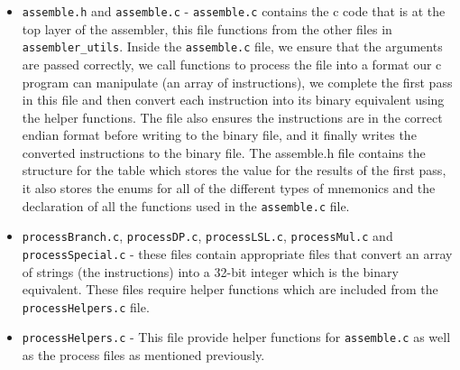 \documentclass[10pt]{article}
\begin{document}
\begin{itemize}
	\item {\tt{assemble.h}} and {\tt{assemble.c}} - {\tt{assemble.c}} contains the c code that is at the top layer of the assembler, this file functions from the other files in {\tt{assembler\_utils}}. Inside the {\tt{assemble.c}} file, we ensure that the arguments are passed correctly, we call functions to process the file into a format our c program can manipulate (an array of instructions), we complete the first pass in this file and then convert each instruction into its binary equivalent using the helper functions. The file also ensures the instructions are in the correct endian format before writing to the binary file, and it finally writes the converted instructions to the binary file.
    The assemble.h file contains the structure for the table which stores the value for the results of the first pass, it also stores the enums for all of the different types of mnemonics and the declaration of all the functions used in the {\tt{assemble.c}} file.
	\item {\tt{processBranch.c}}, {\tt{processDP.c}}, {\tt{processLSL.c}}, {\tt{processMul.c}} and {\tt{processSpecial.c}} - these files contain appropriate files that convert an array of strings (the instructions) into a 32-bit integer which is the binary equivalent. These files require helper functions which are included from the {\tt{processHelpers.c}} file.
	\item {\tt{processHelpers.c}} - This file provide helper functions for {\tt{assemble.c}} as well as the process files as mentioned previously.
	
\end{itemize}


\begin{center}

\end{center}
\end{document}
